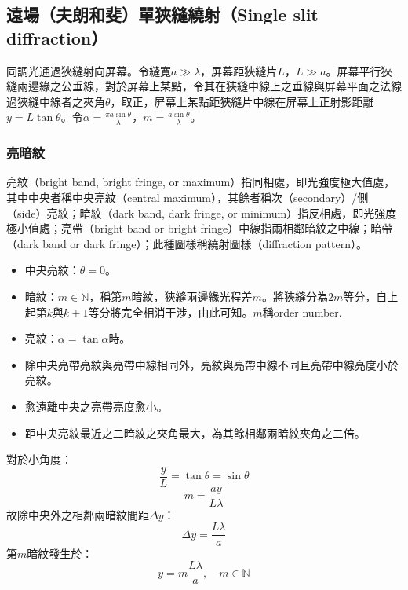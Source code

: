 \documentclass[a4paper,12pt]{report}
\begin{document}
\subsection{遠場（夫朗和斐）單狹縫繞射（Single slit diffraction）}
同調光通過狹縫射向屏幕。令縫寬$a\gg\lambda$，屏幕距狹縫片$L$，$L\gg a$。屏幕平行狹縫兩邊緣之公垂線，對於屏幕上某點，令其在狹縫中線上之垂線與屏幕平面之法線過狹縫中線者之夾角$\theta$，取正，屏幕上某點距狹縫片中線在屏幕上正射影距離$y=L\tan\theta$。令$\alpha=\frac{\pi a\sin\theta}{\lambda}$，$m=\frac{a\sin\theta}{\lambda}$。
\subsubsection{亮暗紋}
亮紋（bright band, bright fringe, or maximum）指同相處，即光強度極大值處，其中中央者稱中央亮紋（central maximum），其餘者稱次（secondary）/側（side）亮紋；暗紋（dark band, dark fringe, or minimum）指反相處，即光強度極小值處；亮帶（bright band or bright fringe）中線指兩相鄰暗紋之中線；暗帶（dark band or dark fringe）；此種圖樣稱繞射圖樣（diffraction pattern）。
\begin{itemize}
\item 中央亮紋：$\theta=0$。
\item 暗紋：$m\in\mathbb{N}$，稱第$m$暗紋，狹縫兩邊緣光程差$m$。將狹縫分為$2m$等分，自上起第$k$與$k+1$等分將完全相消干涉，由此可知。$m$稱order number.
\item 亮紋：$\alpha=\tan\alpha$時。
\item 除中央亮帶亮紋與亮帶中線相同外，亮紋與亮帶中線不同且亮帶中線亮度小於亮紋。
\item 愈遠離中央之亮帶亮度愈小。
\item 距中央亮紋最近之二暗紋之夾角最大，為其餘相鄰兩暗紋夾角之二倍。
\end{itemize}
對於小角度：
\[\frac{y}{L}=\tan\theta=\sin\theta\]
\[m=\frac{ay}{L\lambda}\]
故除中央外之相鄰兩暗紋間距$\Delta y$：
\[\Delta y=\frac{L\lambda}{a}\]
第$m$暗紋發生於：
\[y=m\frac{L\lambda}{a},\quad m\in\mathbb{N}\]
\end{document}
